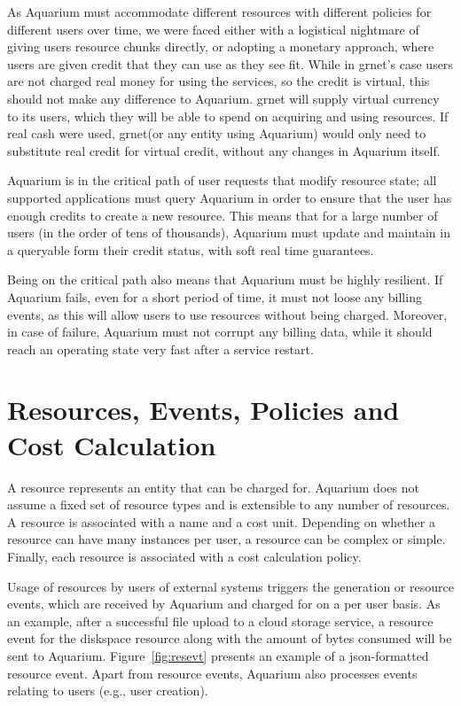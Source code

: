 \documentclass[letterpaper,twocolumn,10pt]{article}
\newcommand{\grnet}{{\sc grnet}\xspace}
\begin{document}
As Aquarium must accommodate different resources with different
policies for different users over time, we were faced either with a
logistical nightmare of giving users resource chunks directly, or
adopting a monetary approach, where users are given credit that they
can use as they see fit. While in \grnet's case users are not charged
real money for using the services, so the credit is virtual, this
should not make any difference to Aquarium. \grnet will supply virtual
currency to its users, which they will be able to spend on acquiring
and using resources. If real cash were used, \grnet (or any entity
using Aquarium) would only need to substitute real credit for virtual
credit, without any changes in Aquarium itself.

Aquarium is in the critical path of user requests that modify resource
state; all supported applications must query Aquarium in order to
ensure that the user has enough credits to create a new resource. This
means that for a large number of users (in the order of tens of thousands),
Aquarium must update and maintain in a queryable form their credit
status, with soft real time guarantees.

Being on the critical path also means that Aquarium must be highly
resilient. If Aquarium fails, even for a short period of time, it must
not loose any billing events, as this will allow users to use
resources without being charged. Moreover, in case of failure,
Aquarium must not corrupt any billing data, while it should reach an
operating state very fast after a service restart.

\section{Resources, Events, Policies and Cost Calculation}

A resource represents an entity that can be charged for. Aquarium does
not assume a fixed set of resource types and is extensible to any
number of resources. A resource is associated with a name and a cost
unit. Depending on whether a resource can have many instances per
user, a resource can be complex or simple. Finally, each resource is
associated with a cost calculation policy.

Usage of resources by users of external systems triggers the generation or
resource events, which are received by Aquarium and charged for on a per user
basis. As an example, after a successful file upload to a cloud storage
service, a resource event for the \textsf{diskspace} resource along with the
amount of bytes consumed will be sent to Aquarium.  Figure~\ref{fig:resevt}
presents an example of a {\sc json}-formatted resource event.  Apart from
resource events, Aquarium also processes events relating to users
(e.g., user creation).
\end{document}
